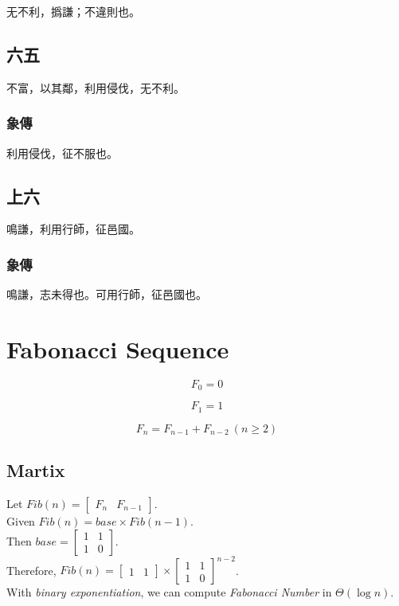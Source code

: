 \documentclass[12pt, a4paper]{article}
\begin{document}
无不利，撝謙；不違則也。

\subsection{六五}

不富，以其鄰，利用侵伐，无不利。

\subsubsection{象傳}

利用侵伐，征不服也。

\subsection{上六}

鳴謙，利用行師，征邑國。

\subsubsection{象傳}

鳴謙，志未得也。可用行師，征邑國也。

\section{Fabonacci Sequence}

\[F_0 = 0\]

\[F_1 = 1\]

\[F_n = F_{n-1} + F_{n-2}\ (n \geq 2)\]

\subsection{Martix}

Let $Fib(n) = \begin{bmatrix} F_n & F_{n-1}\end{bmatrix}$.\\[1cm]
Given $Fib(n) = base \times Fib(n-1)$.\\[1em]
Then $base = \begin{bmatrix} 1 & 1 \\ 1 & 0\end{bmatrix}$.\\
Therefore, $Fib(n) = \begin{bmatrix} 1 & 1\end{bmatrix} \times \begin{bmatrix} 1 & 1 \\ 1 & 0\end{bmatrix}^{n-2}$.\\[10pt]
With \textsl{binary exponentiation}, we can compute \textit{Fabonacci Number} in $\Theta(\log n)$.
\end{document}
